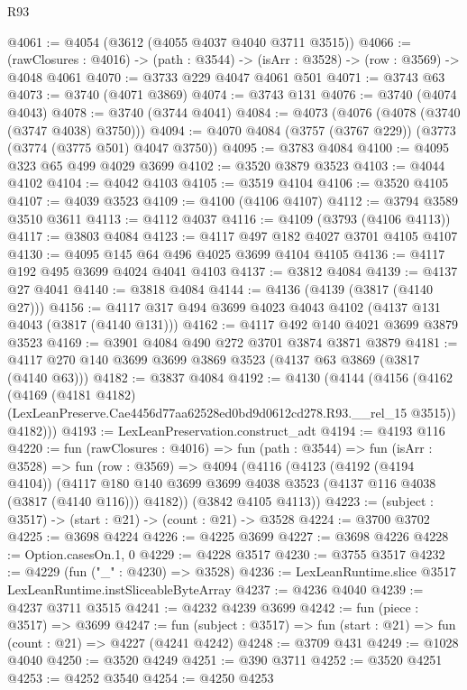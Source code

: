 \begin{lexlean}{R93}
\begin{coremodule}
@4061 := @4054 (@3612 (@4055 @4037 @4040 @3711 @3515))
@4066 := (rawClosures : @4016) -> (path : @3544) -> (isArr : @3528) -> (row : @3569) -> @4048 @4061
@4070 := @3733 @229 @4047 @4061 @501
@4071 := @3743 @63
@4073 := @3740 (@4071 @3869)
@4074 := @3743 @131
@4076 := @3740 (@4074 @4043)
@4078 := @3740 (@3744 @4041)
@4084 := @4073 (@4076 (@4078 (@3740 (@3747 @4038) @3750)))
@4094 := @4070 @4084 (@3757 (@3767 @229)) (@3773 (@3774 (@3775 @501) @4047 @3750))
@4095 := @3783 @4084
@4100 := @4095 @323 @65 @499 @4029 @3699
@4102 := @3520 @3879 @3523
@4103 := @4044 @4102
@4104 := @4042 @4103
@4105 := @3519 @4104
@4106 := @3520 @4105
@4107 := @4039 @3523
@4109 := @4100 (@4106 @4107)
@4112 := @3794 @3589 @3510 @3611
@4113 := @4112 @4037
@4116 := @4109 (@3793 (@4106 @4113))
@4117 := @3803 @4084
@4123 := @4117 @497 @182 @4027 @3701 @4105 @4107
@4130 := @4095 @145 @64 @496 @4025 @3699 @4104 @4105
@4136 := @4117 @192 @495 @3699 @4024 @4041 @4103
@4137 := @3812 @4084
@4139 := @4137 @27 @4041
@4140 := @3818 @4084
@4144 := @4136 (@4139 (@3817 (@4140 @27)))
@4156 := @4117 @317 @494 @3699 @4023 @4043 @4102 (@4137 @131 @4043 (@3817 (@4140 @131)))
@4162 := @4117 @492 @140 @4021 @3699 @3879 @3523
@4169 := @3901 @4084 @490 @272 @3701 @3874 @3871 @3879
@4181 := @4117 @270 @140 @3699 @3699 @3869 @3523 (@4137 @63 @3869 (@3817 (@4140 @63)))
@4182 := @3837 @4084
@4192 := @4130
    (@4144
      (@4156
        (@4162
          (@4169
            (@4181 @4182)
            (LexLeanPreserve.Cae4456d77aa62528ed0bd9d0612cd278.R93.__rel_15 @3515))
          @4182)))
@4193 := LexLeanPreservation.construct_adt
@4194 := @4193 @116
@4220 := fun (rawClosures : @4016) =>
  fun (path : @3544) =>
  fun (isArr : @3528) =>
  fun (row : @3569) =>
  @4094
    (@4116
      (@4123
        (@4192 (@4194 @4104))
        (@4117 @180 @140 @3699 @3699 @4038 @3523 (@4137 @116 @4038 (@3817 (@4140 @116))) @4182))
      (@3842 @4105 @4113))
@4223 := (subject : @3517) -> (start : @21) -> (count : @21) -> @3528
@4224 := @3700 @3702
@4225 := @3698 @4224
@4226 := @4225 @3699
@4227 := @3698 @4226
@4228 := Option.casesOn.{1, 0}
@4229 := @4228 @3517
@4230 := @3755 @3517
@4232 := @4229 (fun ("_" : @4230) => @3528)
@4236 := LexLeanRuntime.slice @3517 LexLeanRuntime.instSliceableByteArray
@4237 := @4236 @4040
@4239 := @4237 @3711 @3515
@4241 := @4232 @4239 @3699
@4242 := fun (piece : @3517) => @3699
@4247 := fun (subject : @3517) => fun (start : @21) => fun (count : @21) => @4227 (@4241 @4242)
@4248 := @3709 @431
@4249 := @1028 @4040
@4250 := @3520 @4249
@4251 := @390 @3711
@4252 := @3520 @4251
@4253 := @4252 @3540
@4254 := @4250 @4253

\end{coremodule}
\end{lexlean}
